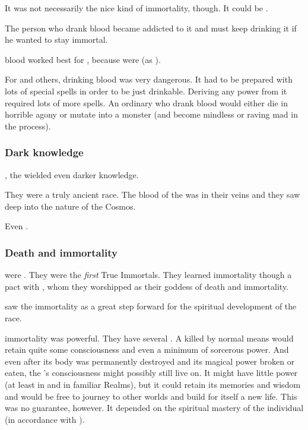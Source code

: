 It was not necessarily the nice kind of immortality, though. 
It could be .

The person who drank \draconian blood became addicted to it and must keep drinking it if he wanted to stay immortal. 

\Dragon blood worked best for \scathae, because \scathae were  (as ). 

For \humans and others, drinking \draconian blood was very dangerous.
It had to be prepared with lots of special spells in order to be just drinkable.
Deriving any power from it required lots of more spells. 
An ordinary \human who drank \draconian blood would either die in horrible agony or mutate into a monster (and become mindless or raving mad in the process). 






\subsubsection{Dark knowledge}
, {the \dragons wielded even darker knowledge}. 

They were a truly ancient race.
The blood of the \xss was in their veins and they saw deep into the nature of the Cosmos.

Even \Criseis {}. 







\subsubsection{Death and immortality}
\Dragons{} were . 
They were the \emph{first} True Immortals. 
They learned immortality though a pact with , whom they worshipped as their goddess of death and immortality.

 saw the \Draconic immortality as a great step forward for the spiritual development of the \ophidian race. 

\Draconian immortality was powerful. 
They have several . 
A \dragon killed by normal means would retain quite some consciousness and even a minimum of sorcerous power. 
And even after its body was permanently destroyed and its magical power broken or eaten, the \dragon's consciousness might possibly still live on. 
It might have little power (at least in \Miith and in familiar Realms), but it could retain its memories and wisdom and would be free to journey to other worlds and build for itself a new life. 
This was no guarantee, however. 
It depended on the spiritual mastery of the individual \dragon (in accordance with ). 

